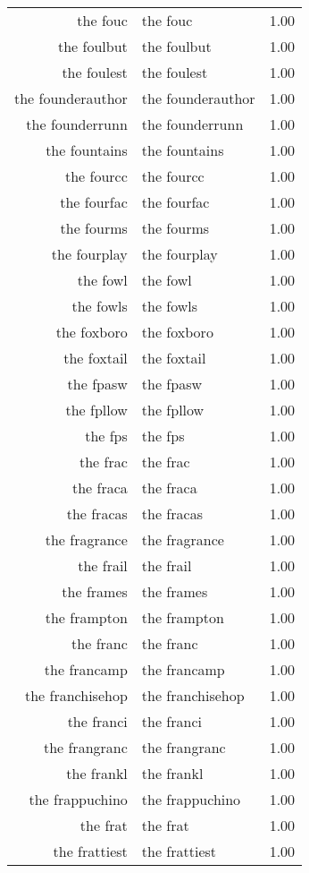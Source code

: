 \begin{table}[ht]
\begin{tabular}{rlr}
  the fouc & the fouc & 1.00 \\ 
  the foulbut & the foulbut & 1.00 \\ 
  the foulest & the foulest & 1.00 \\ 
  the founderauthor & the founderauthor & 1.00 \\ 
  the founderrunn & the founderrunn & 1.00 \\ 
  the fountains & the fountains & 1.00 \\ 
  the fourcc & the fourcc & 1.00 \\ 
  the fourfac & the fourfac & 1.00 \\ 
  the fourms & the fourms & 1.00 \\ 
  the fourplay & the fourplay & 1.00 \\ 
  the fowl & the fowl & 1.00 \\ 
  the fowls & the fowls & 1.00 \\ 
  the foxboro & the foxboro & 1.00 \\ 
  the foxtail & the foxtail & 1.00 \\ 
  the fpasw & the fpasw & 1.00 \\ 
  the fpllow & the fpllow & 1.00 \\ 
  the fps & the fps & 1.00 \\ 
  the frac & the frac & 1.00 \\ 
  the fraca & the fraca & 1.00 \\ 
  the fracas & the fracas & 1.00 \\ 
  the fragrance & the fragrance & 1.00 \\ 
  the frail & the frail & 1.00 \\ 
  the frames & the frames & 1.00 \\ 
  the frampton & the frampton & 1.00 \\ 
  the franc & the franc & 1.00 \\ 
  the francamp & the francamp & 1.00 \\ 
  the franchisehop & the franchisehop & 1.00 \\ 
  the franci & the franci & 1.00 \\ 
  the frangranc & the frangranc & 1.00 \\ 
  the frankl & the frankl & 1.00 \\ 
  the frappuchino & the frappuchino & 1.00 \\ 
  the frat & the frat & 1.00 \\ 
  the frattiest & the frattiest & 1.00 \\ 

\end{tabular}
\end{table}
